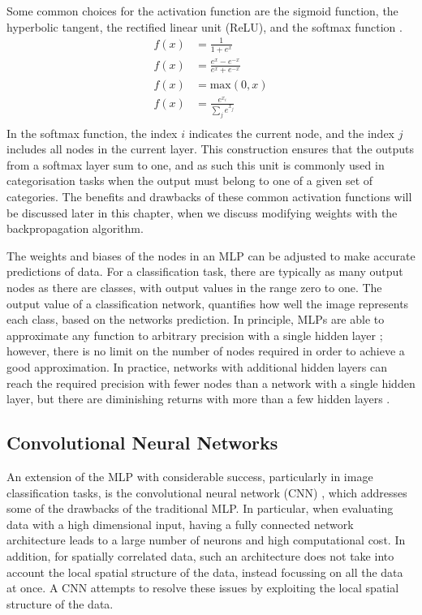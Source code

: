 Some common choices for the activation function are the sigmoid function, the
hyperbolic tangent, the rectified linear unit (ReLU), and the softmax function
\cite{Lecun2015, He2015, Szegedy2015}.
\begin{align}
	\tag{Sigmoid} f(x) &= \frac{1}{1+e^x} \\
	\tag{Tanh}    f(x) &= \frac{e^x - e^{-x}}{e^x+e^{-x}} \\
	\tag{ReLU}    f(x) &= \mbox{max}\left( 0, x \right) \\
	\tag{Softmax} f(x) &= \frac{e^{x_i}}{\displaystyle\sum_j e^{x_j}} \\
	\label{eqn:losses}
\end{align}
In the softmax function, the index $i$ indicates the current node, and the index
$j$ includes all nodes in the current layer. This construction ensures that 
the outputs from a softmax layer sum to one, and as such this unit is commonly 
used in categorisation tasks when the output must belong to one of a given set 
of categories. The benefits and drawbacks of these common activation functions 
will be discussed later in this chapter, when we discuss modifying weights 
with the backpropagation algorithm.

The weights and biases of the nodes in an MLP can be adjusted to make accurate 
predictions of data. For a classification task, there are typically as many
output nodes as there are classes, with output values in the range zero to one. 
The output value of a classification network, quantifies how well the image
represents each class, based on the networks prediction. In principle, MLPs 
are able to approximate any function to arbitrary precision with a 
single hidden layer \cite{Cybenko1989ApproximationBS}; however, there is no 
limit on the number of nodes required in order to achieve a good 
approximation. In practice, networks with additional hidden layers can reach 
the required precision with fewer nodes than a network with a single hidden 
layer, but there are diminishing returns with more than a few hidden layers 
\cite{Reed1999, Lecun2015}.

\subsection{Convolutional Neural Networks}
An extension of the MLP with considerable success, particularly in image 
classification tasks, is the convolutional neural network (CNN) 
\cite{Jackel2008, Szegedy2015, 5537907}, which addresses some of the drawbacks 
of the traditional MLP. In particular, when evaluating data with a high 
dimensional input, having a fully connected network architecture leads to a 
large number of neurons and high computational cost. In addition, for 
spatially correlated data, such an architecture does not take into account the 
local spatial structure of the data, instead focussing on all the data at 
once. A CNN attempts to resolve these issues by exploiting the local spatial 
structure of the data.

